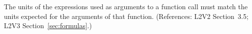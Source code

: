 The units of the expressions used as arguments to a function call
must match the units expected for the arguments of that function.
(References: L2V2 Section~3.5; L2V3 Section~\ref{sec:formulas}.)
